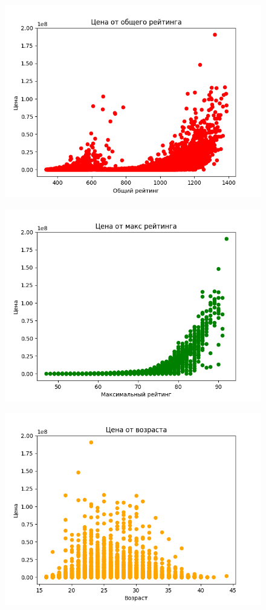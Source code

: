 \documentclass{article}
\begin{document}
\begin{figure}[H]
      \centering
      \includegraphics[width=0.7\linewidth]{total_rating}\label{fig:figure1}
\end{figure}

\begin{figure}[H]
      \centering
      \includegraphics[width=0.7\linewidth]{max_rating}\label{fig:figure2}
\end{figure}

\begin{figure}[H]
      \centering
      \includegraphics[width=0.7\linewidth]{age}\label{fig:figure3}
\end{figure}
\end{document}
